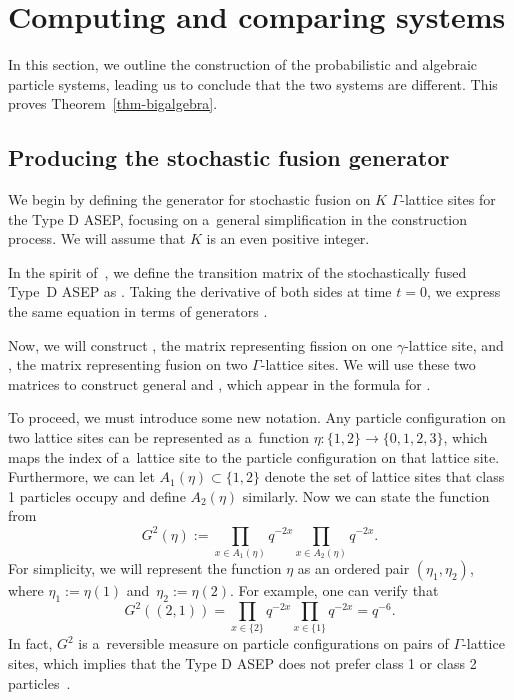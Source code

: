 \documentclass[pdftex]{sigma}
\numberwithin{equation}{section}
\theoremstyle{definition}
\begin{document}
\section{Computing and comparing systems}
\label{section--ProbResults}

In this section, we outline the construction of the probabilistic and algebraic particle systems, leading us to conclude that the two systems are different. This proves Theorem~\ref{thm-bigalgebra}.

\subsection{Producing the stochastic fusion generator}\label{fusion-gen}

We begin by defining the generator for stochastic fusion on $K$ $\Gamma$-lattice sites for the Type D ASEP, focusing on a~general simplification in the construction process. We will assume that $K$ is an even positive integer.


In the spirit of~\cite[Section 3]{kuan2019stochastic}, we define the transition matrix of the stochastically fused Type~D ASEP as
.
Taking the derivative of both sides at time $t=0$, we express the same equation in terms of generators
.

Now, we will construct , the matrix representing fission on one $\gamma$-lattice site, and , the matrix representing fusion on two $\Gamma$-lattice sites. We will use these two matrices to construct general  and , which appear in the formula for .

To proceed, we must introduce some new notation. Any particle configuration on two lattice sites can be represented as a~function $\eta\colon\{1,2\} \rightarrow \{0,1,2,3\}$, which maps the index of a~lattice site to the particle configuration on that lattice site. Furthermore, we can let $A_1(\eta) \subset \{1,2\}$ denote the set of lattice sites that class 1 particles occupy and define $A_2(\eta)$ similarly. Now we can state the function from~\cite[Proposition 1.3]{kuan2020interactingparticlesystemstype}
\[G^2(\eta) := \prod_{x \in A_1(\eta)} q^{-2x}\prod_{x \in A_2(\eta)} q^{-2x}.\]
For simplicity, we will represent the function $\eta$ as an ordered pair $(\eta_1,\eta_2)$, where $\eta_1 := \eta(1)$ and~${\eta_2:= \eta(2)}$. For example, one can verify that
\[G^2((2,1)) = \prod_{x \in \{2\}}q^{-2x}\prod_{x \in \{1\}}q^{-2x} = q^{-6}.\]
In fact, $G^2$ is a~reversible measure on particle configurations on pairs of $\Gamma$-lattice sites, which implies that the Type D ASEP does not prefer class 1 or class 2 particles~\cite{kuan2020interactingparticlesystemstype}.
\end{document}
